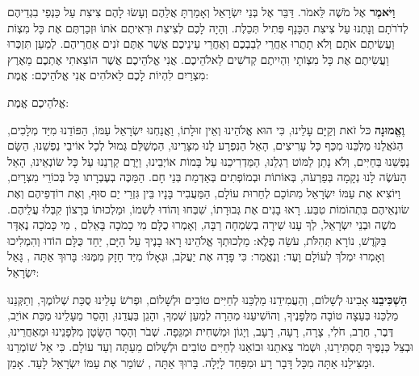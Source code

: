 \textbf{וַיֹּאמֶר} \Shem{} אֶל מֹשֶׁה לֵּאמֹר. דַּבֵּר אֶל בְּנֵי יִשְׂרָאֵל וְאָמַרְתָּ אֲלֵהֶם וְעָשׂוּ לָהֶם צִיצִת עַל כַּנְפֵי בִגְדֵיהֶם לְדֹרֹתָם וְנָתְנוּ עַל צִיצִת הַכָּנָף פְּתִיל תְּכֵלֶת. וְהָיָה לָכֶם לְצִיצִת וּרְאִיתֶם אֹתוֹ וּזְכַרְתֶּם אֶת כָּל מִצְוֹת \Shem{} וַעֲשִׂיתֶם אֹתָם וְלֹא תָתֻרוּ אַחֲרֵי לְבַבְכֶם וְאַחֲרֵי עֵינֵיכֶם אֲשֶׁר אַתֶּם זֹנִים אַחֲרֵיהֶם. לְמַעַן תִּזְכְּרוּ וַעֲשִׂיתֶם אֶת כָּל מִצְוֹתָי וִהְיִיתֶם קְדֹשִׁים לֵאלֹהֵיכֶם. אֲנִי \Shem{} אֱלֹהֵיכֶם אֲשֶׁר הוֹצֵאתִי אֶתְכֶם מֵאֶרֶץ מִצְרַיִם לִהְיוֹת לָכֶם לֵאלֹהִים אֲנִי \Shem{} אֱלֹהֵיכֶם: אֱמֶת:

\Shem{} אֱלֹהֵיכֶם אֱמֶת:

\textbf{וֶאֱמוּנָה} כּל זֹאת וְקַיָּם עָלֵינוּ, כִּי הוּא \Shem{} אֱלֹהֵינוּ וְאֵין זוּלָתוֹ, וַאֲנַחְנוּ יִשְׂרָאֵל עַמּוֹ, הַפּוֹדֵנוּ מִיַּד מְלָכִים, הַגֹּאֲלֵנוּ מַלְכֵּנוּ מִכַּף כָּל עָרִיצִים, הָאֵל הַנִּפְרָע לָנוּ מִצָּרֵינוּ, הַמְשַׁלֵּם גְּמוּל לְכָל אוֹיבֵי נַפְשֵׁנוּ, הַשָּׂם נַפְשֵׁנוּ בַּחַיִּים, וְלֹא נָתַן לַמּוֹט רַגְלֵנוּ, הַמַּדְרִיכֵנוּ עַל בָּמוֹת אוֹיְבֵינוּ, וַיָּרֶם קַרְנֵנוּ עַל כָּל שׂוֹנְאֵינוּ, הָאֵל הָעֹשֶׂה לָנוּ נְקָמָה בְּפַרְעֹה, בְּאוֹתוֹת וּבְמוֹפְתִים בְּאַדְמַת בְּנֵי חָם. הַמַּכֶּה בְעֶבְרָתו כָּל בְּכוֹרֵי מִצְרָיִם, וַיּוֹצִיא אֶת עַמּוֹ יִשְׂרָאֵל מִתּוֹכָם לְחֵרוּת עוֹלָם, הַמַּעֲבִיר בָּנָיו בֵּין גִּזְרֵי יַם סוּף, וְאֶת רוֹדְפֵיהֶם וְאֶת שׂונְאֵיהֶם בִּתְהוֹמוֹת טִבַּע. רָאוּ בָנִים אֶת גְּבוּרָתוֹ, שִׁבְּחוּ וְהוֹדוּ לִשְׁמוֹ, וּמַלְכוּתוֹ בְּרָצוֹן קִבְּלוּ עֲלֵיהֶם. מֹשֶׁה וּבְנֵי יִשְׂרָאֵל, לְךָ עָנוּ שִׁירָה בְשִׂמְחָה רַבָּה, וְאָמְרוּ כֻלָּם מִי כָמֹכָה בָּאֵלִם \Shem{}, מִי כָּמֹכָה נֶאְדָּר בַּקֹּדֶשׁ, נוֹרָא תְּהִלֹּת, עֹשֵׂה פֶלֶא: מַלְכוּתְךָ \Shem{} אֱלֹהֵינוּ רָאוּ בָנֶיךָ עַל הַיָּם, יַחַד כֻּלָּם הוֹדוּ וְהִמְלִיכוּ וְאָמְרוּ \Shem{} יִמְלֹךְ לְעוֹלָם וָעֶד: וְנֶאֱמַר: כִּי פָדָה \Shem{} אֶת יַעֲקֹב, וּגְאָלוֹ מִיַּד חָזָק מִמֶּנּוּ: בָּרוּךְ אַתָּה \Shem{}, גָּאַל יִשְׂרָאֵל:

\textbf{הַשְׁכִּיבֵנוּ} אָבִינוּ לְשָׁלוֹם, וְהַעֲמִידֵנוּ מַלְכֵּנוּ לְחַיִּים טוֹבִים וּלְשָׁלוֹם, וּפְרֹשׂ עָלֵינוּ סֻכַּת שְׁלוֹמֶךָ, וְתַקְּנֵנוּ מַלְכֵּנוּ בְּעֵצָה טוֹבָה מִלְּפָנֶיךָ, וְהוֹשִׁיעֵנוּ מְהֵרָה לְמַעַן שְׁמְךָ, והָגֵן בַּעֲדֵנוּ, וְהָסֵר מֵעָלֵינוּ מַכַּת אוֹיֵב, דֶּבֶר, חֶרֶב, חֹלִי, צָרָה, רָעָה, רָעָב, וְיָגוֹן וּמַשְׁחִית וּמַגֵּפָה. שְׁבֹר וְהָסֵר הַשָּׂטָן מִלְּפָנֵינוּ וּמֵאַחֲרֵינוּ, וּבְצֵל כְּנָפֶיךָ תַּסְתִּירֵנוּ, וּשְׁמֹר צֵאתֵנוּ וּבוֹאֵנוּ לְחַיִּים טוֹבִים וּלְשָׁלוֹם מֵעַתָּה וְעַד עוֹלָם. כִּי אֵל שׁוֹמְרֵנוּ וּמַצִּילֵנוּ אַתָּה מִכָּל דָּבָר רָע וּמִפַּחַד לָיְלָה. בָּרוּךְ אַתָּה \Shem{}, שׁוֹמֵר אֶת עַמּוֹ יִשְׂרָאֵל לָעַד. אָמֵן.


